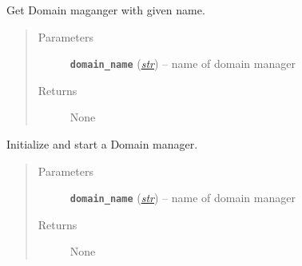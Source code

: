 \documentclass[letterpaper,10pt,english]{sphinxmanual}
\begin{document}
\begin{fulllineitems}
\begin{fulllineitems}
\begin{quote}
\begin{description}
\begin{itemize}
\end{itemize}

\end{description}\end{quote}

\end{fulllineitems}


\begin{fulllineitems}
\label{adapt/adaptation:escape.adapt.adaptation.DomainConfigurator.get}
Get Domain maganger with given name.
\begin{quote}\begin{description}
\item[{Parameters}] \leavevmode
\textbf{\texttt{domain\_name}} (\href{https://docs.python.org/2.7/library/functions.html\#str}{\emph{str}}) -- name of domain manager

\item[{Returns}] \leavevmode
None

\end{description}\end{quote}

\end{fulllineitems}


\begin{fulllineitems}
\label{adapt/adaptation:escape.adapt.adaptation.DomainConfigurator.start}
Initialize and start a Domain manager.
\begin{quote}\begin{description}
\item[{Parameters}] \leavevmode
\textbf{\texttt{domain\_name}} (\href{https://docs.python.org/2.7/library/functions.html\#str}{\emph{str}}) -- name of domain manager

\item[{Returns}] \leavevmode
None

\end{description}\end{quote}

\end{fulllineitems}



\end{fulllineitems}
\end{document}

